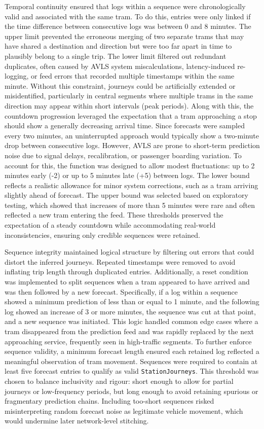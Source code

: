     Temporal continuity ensured that logs within a sequence were chronologically valid and associated with the same tram. To do this, entries were only linked if the time difference between consecutive logs was between 0 and 8 minutes. The upper limit prevented the erroneous merging of two separate trams that may have shared a destination and direction but were too far apart in time to plausibly belong to a single trip. The lower limit filtered out redundant duplicates, often caused by AVLS system miscalculations, latency-induced re-logging, or feed errors that recorded multiple timestamps within the same minute. Without this constraint, journeys could be artificially extended or misidentified, particularly in central segments where multiple trams in the same direction may appear within short intervals (peak periods). Along with this, the countdown progression leveraged the expectation that a tram approaching a stop should show a generally decreasing arrival time. Since forecasts were sampled every two minutes, an uninterrupted approach would typically show a two-minute drop between consecutive logs. However, AVLS are prone to short-term prediction noise due to signal delays, recalibration, or passenger boarding variation. To account for this, the function was designed to allow modest fluctuations: up to 2 minutes early (-2) or up to 5 minutes late (+5) between logs. The lower bound reflects a realistic allowance for minor system corrections, such as a tram arriving slightly ahead of forecast. The upper bound was selected based on exploratory testing, which showed that increases of more than 5 minutes were rare and often reflected a new tram entering the feed. These thresholds preserved the expectation of a steady countdown while accommodating real-world inconsistencies, ensuring only credible sequences were retained.

    Sequence integrity maintained logical structure by filtering out errors that could distort the inferred journeys. Repeated timestamps were removed to avoid inflating trip length through duplicated entries. Additionally, a reset condition was implemented to split sequences when a tram appeared to have arrived and was then followed by a new forecast. Specifically, if a log within a sequence showed a minimum prediction of less than or equal to 1 minute, and the following log showed an increase of 3 or more minutes, the sequence was cut at that point, and a new sequence was initiated. This logic handled common edge cases where a tram disappeared from the prediction feed and was rapidly replaced by the next approaching service, frequently seen in high-traffic segments. To further enforce sequence validity, a minimum forecast length ensured each retained log reflected a meaningful observation of tram movement. Sequences were required to contain at least five forecast entries to qualify as valid \texttt{StationJourneys}. This threshold was chosen to balance inclusivity and rigour: short enough to allow for partial journeys or low-frequency periods, but long enough to avoid retaining spurious or fragmentary prediction chains. Including too-short sequences risked misinterpreting random forecast noise as legitimate vehicle movement, which would undermine later network-level stitching.

